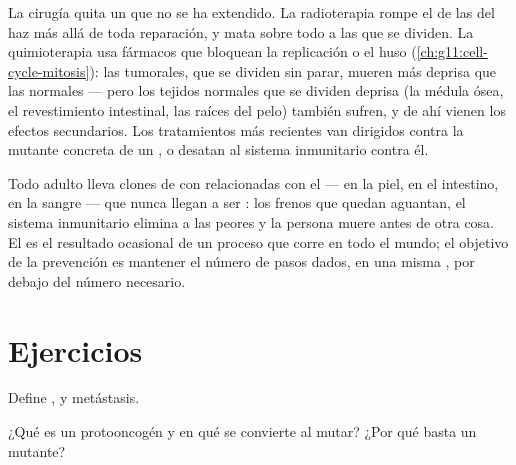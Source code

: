 \begin{example}\label{ex:g11:cancer:treatments}
La cirugía quita un  que no se ha extendido. La radioterapia rompe
el  de las  del haz más allá de toda reparación, y mata sobre
todo a las que se dividen. La quimioterapia usa fármacos que bloquean
la replicación o el huso (\cref{ch:g11:cell-cycle-mitosis}): las
 tumorales, que se dividen sin parar, mueren más deprisa que las
normales --- pero los tejidos normales que se dividen deprisa (la
médula ósea, el revestimiento intestinal, las raíces del pelo) también
sufren, y de ahí vienen los efectos secundarios. Los tratamientos más
recientes van dirigidos contra la  mutante concreta de un
, o desatan al sistema inmunitario contra él.
\end{example}

\begin{remark}\label{rem:g11:cancer:everyone}
Todo adulto lleva clones de  con  relacionadas con el
 --- en la piel, en el intestino, en la sangre --- que nunca
llegan a ser : los frenos que quedan aguantan, el sistema
inmunitario elimina a las peores y la persona muere antes de otra cosa.
El  es el resultado ocasional de un proceso que corre en todo el
mundo; el objetivo de la prevención es mantener el número de pasos
dados, en una misma , por debajo del número necesario.
\end{remark}

\section{Ejercicios}

\begin{exercise}[$\star$]\label{exo:g11:cancer:1}
Define ,  y metástasis.
\end{exercise}

\begin{exercise}[$\star$]\label{exo:g11:cancer:2}
¿Qué es un protooncogén y en qué se convierte al mutar? ¿Por qué basta
un  mutante?
\end{exercise}

